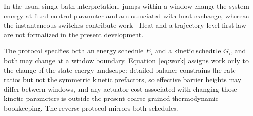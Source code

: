 In the usual single-bath interpretation, jumps within a window change the system energy at fixed control parameter and are associated with heat exchange, whereas the instantaneous switches contribute work \parencite{Sekimoto2010,Seifert2012}. Heat and a trajectory-level first law are not formalized in the present development.

The protocol specifies both an energy schedule $E_i$ and a kinetic schedule $G_i$, and both may change at a window boundary. Equation~\eqref{eq:work} assigns work only to the change of the state-energy landscape: detailed balance constrains the rate ratios but not the symmetric kinetic prefactors, so effective barrier heights may differ between windows, and any actuator cost associated with changing those kinetic parameters is outside the present coarse-grained thermodynamic bookkeeping. The reverse protocol mirrors both schedules.

